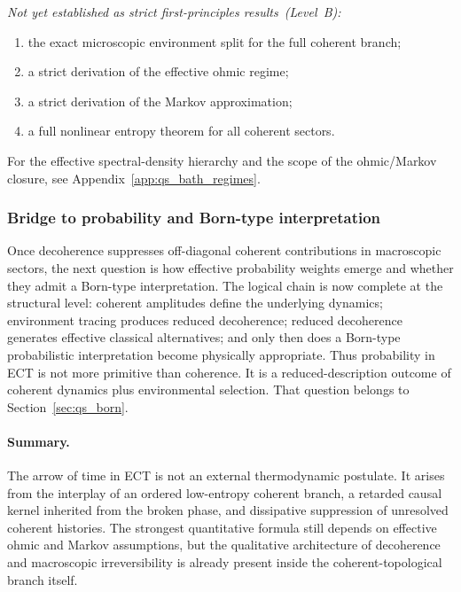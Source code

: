 \documentclass[11pt,a4paper]{article}
\numberwithin{equation}{section}
\begin{document}
\textit{Not yet established as strict first-principles results~(Level~B):}
\begin{enumerate}[label=(\roman*)]
  \item the exact microscopic environment split for the full coherent
    branch;
  \item a strict derivation of the effective ohmic regime;
  \item a strict derivation of the Markov approximation;
  \item a full nonlinear entropy theorem for all coherent sectors.
\end{enumerate}

For the effective spectral-density hierarchy and the scope of the
ohmic/Markov closure, see Appendix~\ref{app:qs_bath_regimes}.

\subsubsection*{Bridge to probability and Born-type interpretation}

Once decoherence suppresses off-diagonal coherent contributions in
macroscopic sectors, the next question is how effective probability
weights emerge and whether they admit a Born-type interpretation.
The logical chain is now complete at the structural level:
coherent amplitudes define the underlying dynamics;
environment tracing produces reduced decoherence;
reduced decoherence generates effective classical alternatives;
and only then does a Born-type probabilistic interpretation become
physically appropriate.
Thus probability in ECT is not more primitive than coherence.
It is a reduced-description outcome of coherent dynamics plus
environmental selection.
That question belongs to Section~\ref{sec:qs_born}.

\paragraph{Summary.}
The arrow of time in ECT is not an external thermodynamic postulate.
It arises from the interplay of an ordered low-entropy coherent branch,
a retarded causal kernel inherited from the broken phase, and
dissipative suppression of unresolved coherent histories.
The strongest quantitative formula still depends on effective ohmic and
Markov assumptions, but the qualitative architecture of decoherence and
macroscopic irreversibility is already present inside the
coherent-topological branch itself.

\end{document}
